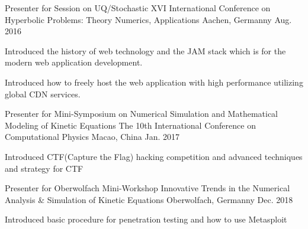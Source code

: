 

\begin{cventries}

  \cventry
    {Presenter for Session on UQ/Stochastic} %
    {XVI International Conference on Hyperbolic Problems: Theory Numerics, Applications} %
    {Aachen, Germanny} %
    {Aug. 2016} %
    {
      \begin{cvitems} %
        \item {Introduced the history of web technology and the JAM stack which is for the modern web application development.}
        \item {Introduced how to freely host the web application with high performance utilizing global CDN services.}
      \end{cvitems}
    }

  \cventry
    {Presenter for Mini-Symposium on Numerical Simulation and Mathematical Modeling of Kinetic Equations} %
    {The 10th International Conference on Computational Physics} %
    {Macao, China} %
    {Jan. 2017} %
    {
      \begin{cvitems} %
        \item {Introduced CTF(Capture the Flag) hacking competition and advanced techniques and strategy for CTF}
      \end{cvitems}
    }

  \cventry
    {Presenter for Oberwolfach Mini-Workshop} %
    {Innovative Trends in the Numerical Analysis \& Simulation of Kinetic Equations} %
    {Oberwolfach, Germanny} %
    {Dec. 2018} %
    {
      \begin{cvitems} %
        \item {Introduced basic procedure for penetration testing and how to use Metasploit}
      \end{cvitems}
    }

\end{cventries}
